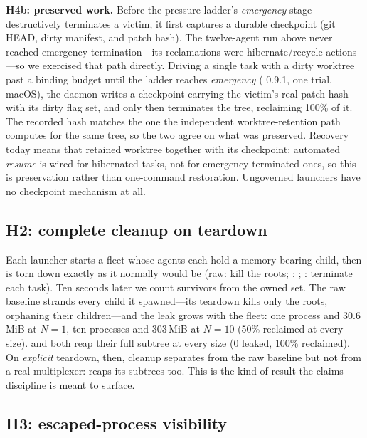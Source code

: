 \textbf{H4b: preserved work.} Before the pressure ladder's \emph{emergency}
stage destructively terminates a victim, it first captures a durable checkpoint (git HEAD, dirty manifest, and patch
hash). The twelve-agent run above never reached emergency
termination---its reclamations were hibernate/recycle actions---so we exercised that path directly.
Driving a single task with a dirty worktree past a binding budget until the ladder reaches
\emph{emergency} (\sys{} 0.9.1, one trial, macOS), the daemon writes a checkpoint carrying the
victim's real patch hash with its dirty flag set, and only then terminates the tree, reclaiming
100\% of it. The recorded hash matches the one the independent worktree-retention path computes for
the same tree, so the two agree on what was preserved. Recovery today means that retained worktree
together with its checkpoint: automated \emph{resume} is wired for hibernated tasks, not for
emergency-terminated ones, so this is preservation rather than one-command restoration. Ungoverned
launchers have no checkpoint mechanism at all.

\subsection{H2: complete cleanup on teardown}

Each launcher starts a fleet whose agents each hold a memory-bearing child, then is torn down exactly
as it normally would be (raw: kill the roots; : ; \sys{}: terminate each
task). Ten seconds later we count survivors from the owned set. The raw baseline strands every child
it spawned---its teardown kills only the roots, orphaning their children---and the leak grows with
the fleet: one process and 30.6\,MiB at $N{=}1$, ten processes and 303\,MiB at $N{=}10$ (50\%
reclaimed at every size).  and \sys{} both reap their full subtree at every size (0 leaked,
100\% reclaimed). On \emph{explicit} teardown, then, cleanup separates \sys{} from the raw baseline but
not from a real multiplexer:  reaps its subtrees too. This is the kind of result the claims
discipline is meant to surface.

\subsection{H3: escaped-process visibility}

